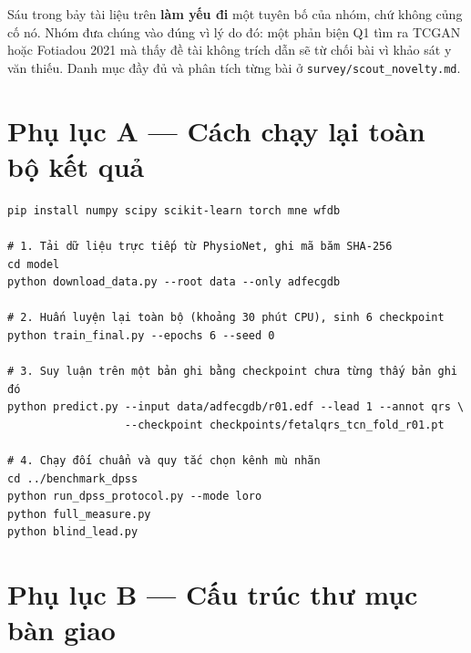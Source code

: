 \begin{ghichu}[title={Vì sao bảy tài liệu bổ sung này quan trọng hơn bảy tài liệu thường}]
Sáu trong bảy tài liệu trên \textbf{làm yếu đi} một tuyên bố của nhóm, chứ không củng cố nó. Nhóm đưa
chúng vào đúng vì lý do đó: một phản biện Q1 tìm ra TCGAN hoặc Fotiadou 2021 mà thấy đề tài không trích
dẫn sẽ từ chối bài vì khảo sát y văn thiếu. Danh mục đầy đủ và phân tích từng bài ở
\texttt{survey/scout\_novelty.md}.
\end{ghichu}

\clearpage

\section*{Phụ lục A --- Cách chạy lại toàn bộ kết quả}

\begin{verbatim}
pip install numpy scipy scikit-learn torch mne wfdb

# 1. Tải dữ liệu trực tiếp từ PhysioNet, ghi mã băm SHA-256
cd model
python download_data.py --root data --only adfecgdb

# 2. Huấn luyện lại toàn bộ (khoảng 30 phút CPU), sinh 6 checkpoint
python train_final.py --epochs 6 --seed 0

# 3. Suy luận trên một bản ghi bằng checkpoint chưa từng thấy bản ghi đó
python predict.py --input data/adfecgdb/r01.edf --lead 1 --annot qrs \
                  --checkpoint checkpoints/fetalqrs_tcn_fold_r01.pt

# 4. Chạy đối chuẩn và quy tắc chọn kênh mù nhãn
cd ../benchmark_dpss
python run_dpss_protocol.py --mode loro
python full_measure.py
python blind_lead.py
\end{verbatim}

\section*{Phụ lục B --- Cấu trúc thư mục bàn giao}

